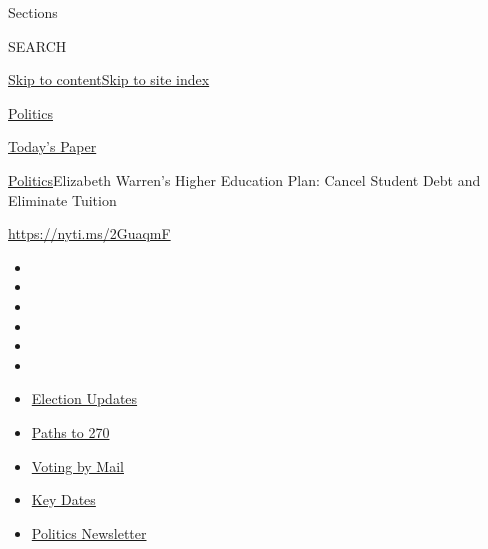 Sections

SEARCH

\protect\hyperlink{site-content}{Skip to
content}\protect\hyperlink{site-index}{Skip to site index}

\href{https://www.nytimes3xbfgragh.onion/section/politics}{Politics}

\href{https://myaccount.nytimes3xbfgragh.onion/auth/login?response_type=cookie\&client_id=vi}{}

\href{https://www.nytimes3xbfgragh.onion/section/todayspaper}{Today's
Paper}

\href{/section/politics}{Politics}\textbar{}Elizabeth Warren's Higher
Education Plan: Cancel Student Debt and Eliminate Tuition

\url{https://nyti.ms/2GuaqmF}

\begin{itemize}
\item
\item
\item
\item
\item
\item
\end{itemize}

\begin{itemize}
\item
  \href{https://www.nytimes3xbfgragh.onion/live/2020/09/07/us/trump-vs-biden?action=click\&pgtype=Article\&state=default\&region=TOP_BANNER\&context=storylines_menu}{Election
  Updates}
\item
  \href{https://www.nytimes3xbfgragh.onion/interactive/2020/us/elections/election-states-biden-trump.html?action=click\&pgtype=Article\&state=default\&region=TOP_BANNER\&context=storylines_menu}{Paths
  to 270}
\item
  \href{https://www.nytimes3xbfgragh.onion/interactive/2020/08/31/us/politics/vote-by-mail-deadlines.html?action=click\&pgtype=Article\&state=default\&region=TOP_BANNER\&context=storylines_menu}{Voting
  by Mail}
\item
  \href{https://www.nytimes3xbfgragh.onion/interactive/2019/us/elections/2020-presidential-election-calendar.html?action=click\&pgtype=Article\&state=default\&region=TOP_BANNER\&context=storylines_menu}{Key
  Dates}
\item
  \href{https://www.nytimes3xbfgragh.onion/newsletters/politics?action=click\&pgtype=Article\&state=default\&region=TOP_BANNER\&context=storylines_menu}{Politics
  Newsletter}
\end{itemize}

